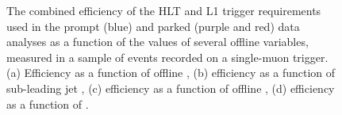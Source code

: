 \begin{figure}
  \caption{The combined efficiency of the \ac{HLT} and \ac{L1} trigger requirements used in the prompt (blue) and parked (purple and red) data analyses as a function of the values of several offline variables, measured in a sample of events recorded on a single-muon trigger. (a) Efficiency as a function of offline \detajj, (b) efficiency as a function of sub-leading jet \pt, (c) efficiency as a function of offline \METnoMU, (d) efficiency as a function of \Mjj.}
  \label{fig:prompttrigplots2}
\end{figure}

